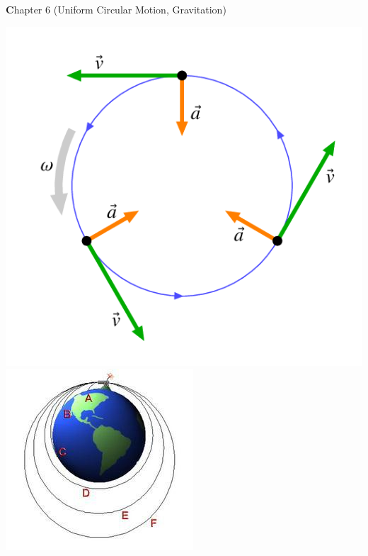 \documentclass[10pt]{exam}
\author{Rohrbach}
\date{\today}
\def\mytitle{Chapter 6 (Uniform Circular Motion, Gravitation)}
\def\mymaketitle{
  \begin{flushleft}
    {\LARGE \textbf \mytitle \par}
  \end{flushleft}
}
\begin{document}
\mymaketitle



\newcommand{\stampbox}[1]{

  \hfill
  \begin{tikzpicture}[every text node part/.style={align=center}]
     \node[gray!50,draw,rounded corners] at (0,0) 
      {\sc Stamp \\ \sc Here \\ \small #1 \sc Points};
  \end{tikzpicture}
  \vspace{1em}
  
  \hrule

}

\begin{center}

  \includegraphics[scale=0.3]{circ.png} \hspace{10em}
  \includegraphics[scale=0.6]{orbitingcannonballs.jpg}
\end{center}
\end{document}
